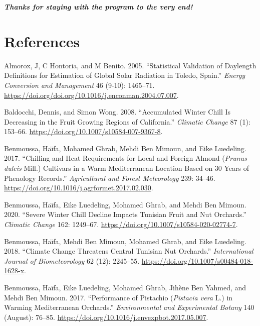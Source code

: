 \documentclass[
]{book}
\begin{document}
\textbf{\emph{Thanks for staying with the program to the very end!}}

\hypertarget{refs}{%
\chapter*{References}\label{refs}}

\hypertarget{refs}{}
\leavevmode\hypertarget{ref-almorox2005statistical}{}%
Almorox, J, C Hontoria, and M Benito. 2005. ``Statistical Validation of Daylength Definitions for Estimation of Global Solar Radiation in Toledo, Spain.'' \emph{Energy Conversion and Management} 46 (9-10): 1465--71. \url{https://doi.org/doi.org/10.1016/j.enconman.2004.07.007}.

\leavevmode\hypertarget{ref-baldocchi2008accumulated}{}%
Baldocchi, Dennis, and Simon Wong. 2008. ``Accumulated Winter Chill Is Decreasing in the Fruit Growing Regions of California.'' \emph{Climatic Change} 87 (1): 153--66. \url{https://doi.org/10.1007/s10584-007-9367-8}.

\leavevmode\hypertarget{ref-benmoussa2017chilling}{}%
Benmoussa, Haı̈fa, Mohamed Ghrab, Mehdi Ben Mimoun, and Eike Luedeling. 2017. ``Chilling and Heat Requirements for Local and Foreign Almond (\emph{Prunus dulcis} Mill.) Cultivars in a Warm Mediterranean Location Based on 30 Years of Phenology Records.'' \emph{Agricultural and Forest Meteorology} 239: 34--46. \url{https://doi.org/10.1016/j.agrformet.2017.02.030}.

\leavevmode\hypertarget{ref-benmoussa2020severe}{}%
Benmoussa, Haı̈fa, Eike Luedeling, Mohamed Ghrab, and Mehdi Ben Mimoun. 2020. ``Severe Winter Chill Decline Impacts Tunisian Fruit and Nut Orchards.'' \emph{Climatic Change} 162: 1249--67. \url{https://doi.org/10.1007/s10584-020-02774-7}.

\leavevmode\hypertarget{ref-benmoussa2018climate}{}%
Benmoussa, Haı̈fa, Mehdi Ben Mimoun, Mohamed Ghrab, and Eike Luedeling. 2018. ``Climate Change Threatens Central Tunisian Nut Orchards.'' \emph{International Journal of Biometeorology} 62 (12): 2245--55. \url{https://doi.org/10.1007/s00484-018-1628-x}.

\leavevmode\hypertarget{ref-benmoussa_performance_2017}{}%
Benmoussa, Haïfa, Eike Luedeling, Mohamed Ghrab, Jihène Ben Yahmed, and Mehdi Ben Mimoun. 2017. ``Performance of Pistachio (\emph{Pistacia vera} L.) in Warming Mediterranean Orchards.'' \emph{Environmental and Experimental Botany} 140 (August): 76--85. \url{https://doi.org/10.1016/j.envexpbot.2017.05.007}.
\end{document}
